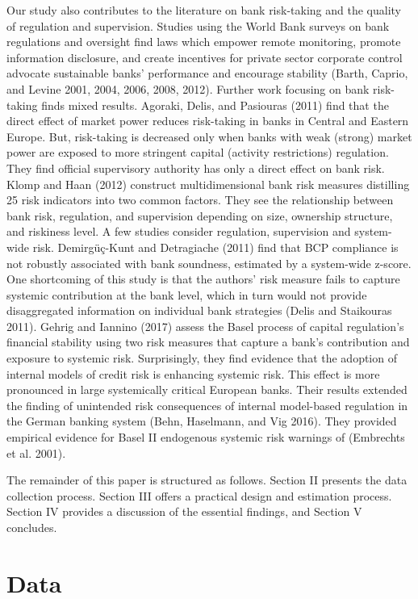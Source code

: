 \documentclass[
  10pt,
]{article}
\begin{document}
Our study also contributes to the literature on bank risk-taking and the
quality of regulation and supervision. Studies using the World Bank
surveys on bank regulations and oversight find laws which empower remote
monitoring, promote information disclosure, and create incentives for
private sector corporate control advocate sustainable banks' performance
and encourage stability (Barth, Caprio, and Levine 2001, 2004, 2006,
2008, 2012). Further work focusing on bank risk-taking finds mixed
results. Agoraki, Delis, and Pasiouras (2011) find that the direct
effect of market power reduces risk-taking in banks in Central and
Eastern Europe. But, risk-taking is decreased only when banks with weak
(strong) market power are exposed to more stringent capital (activity
restrictions) regulation. They find official supervisory authority has
only a direct effect on bank risk. Klomp and Haan (2012) construct
multidimensional bank risk measures distilling 25 risk indicators into
two common factors. They see the relationship between bank risk,
regulation, and supervision depending on size, ownership structure, and
riskiness level. A few studies consider regulation, supervision and
system-wide risk. Demirgüç-Kunt and Detragiache (2011) find that BCP
compliance is not robustly associated with bank soundness, estimated by
a system-wide z-score. One shortcoming of this study is that the
authors' risk measure fails to capture systemic contribution at the bank
level, which in turn would not provide disaggregated information on
individual bank strategies (Delis and Staikouras 2011). Gehrig and
Iannino (2017) assess the Basel process of capital regulation's
financial stability using two risk measures that capture a bank's
contribution and exposure to systemic risk. Surprisingly, they find
evidence that the adoption of internal models of credit risk is
enhancing systemic risk. This effect is more pronounced in large
systemically critical European banks. Their results extended the finding
of unintended risk consequences of internal model-based regulation in
the German banking system (Behn, Haselmann, and Vig 2016). They provided
empirical evidence for Basel II endogenous systemic risk warnings of
(Embrechts et al. 2001).

The remainder of this paper is structured as follows. Section II
presents the data collection process. Section III offers a practical
design and estimation process. Section IV provides a discussion of the
essential findings, and Section V concludes.

\hypertarget{data}{%
\section{Data}\label{data}}
\end{document}
